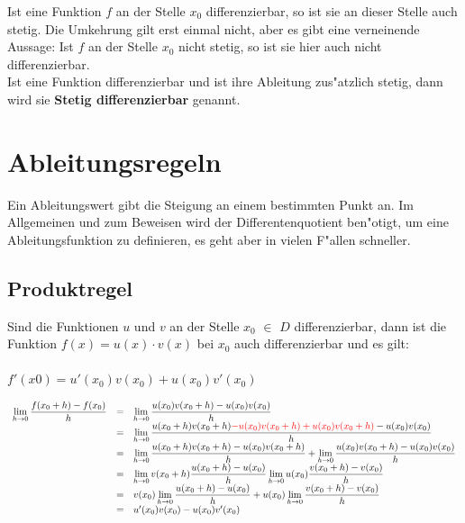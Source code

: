 Ist eine Funktion $f$ an der Stelle $x_{0}$ differenzierbar, so ist sie an dieser Stelle auch stetig.
Die Umkehrung gilt erst einmal nicht, aber es gibt eine verneinende Aussage: Ist $f$ an der Stelle $x_{0}$ nicht stetig, so ist sie hier auch nicht differenzierbar.\\

Ist eine Funktion differenzierbar und ist ihre Ableitung zus"atzlich stetig, dann wird sie \textbf{Stetig differenzierbar} genannt.

\section{Ableitungsregeln}


Ein Ableitungswert gibt die Steigung an einem bestimmten Punkt an. Im Allgemeinen und zum Beweisen wird der Differentenquotient ben"otigt, um eine Ableitungsfunktion zu definieren, es geht aber in vielen F"allen schneller.

\subsection{Produktregel}
\begin{Definition}
Sind die Funktionen $u$ und $v$ an der Stelle $x_{0}$ $\in$ $D$ differenzierbar, dann ist die Funktion $f(x)=u(x)\cdot v(x)$ bei $x_{0}$ auch differenzierbar und es gilt: \\
\\
$f'(x0) = u'(x_{0})v(x_{0})+u(x_{0})v'(x_{0})$\\
\end{Definition}
\begin{Beweis}
$
\begin{array}{rcl}
\lim\limits_{h \rightarrow 0} {\dfrac{f(x_{0}+h)-f(x_{0})}{h}} & = & \lim\limits_{h \rightarrow 0} {\dfrac{u(x_{0})v({x_{0}+h)-u(x_{0})v(x_{0})}}{h}}\\
&=&\lim\limits_{h \rightarrow 0} {\dfrac{u(x_{0}+h)v(x_{0}+h)\textcolor{red}{-u(x_{0})v(x_{0}+h)+u(x_{0})v(x_{0}+h)}-u(x_{0})v(x_{0}) }{h}}\\
&=&\lim\limits_{h \rightarrow 0} {\dfrac{u(x_{0}+h)v(x_{0}+h)-u(x_{0})v(x_{0}+h)}{h}} + \lim\limits_{h \rightarrow 0} {\dfrac{u(x_{0})v(x_{0}+h)-u(x_{0})v(x_{0})}{h}}\\
&=&\lim\limits_{h \rightarrow 0} {v(x_{0}+h)\dfrac{u(x_{0}+h)-u(x_{0})}{h}} \lim\limits_{h \rightarrow 0} {u(x_{0})\dfrac{v(x_{0}+h)-v(x_{0})}{h}}\\
&=& v(x_{0})\lim\limits_{h \rightarrow 0}{\dfrac{u(x_{0}+h)-u(x_{0})}{h}} +u(x_{0}) \lim\limits_{h \rightarrow 0} {\dfrac{v(x_{0}+h)-v(x_{0})}{h}}\\
&=& u'(x_{0})v(x_{0}) - u(x_{0})v'(x_{0})
\end{array}
$
\end{Beweis}

